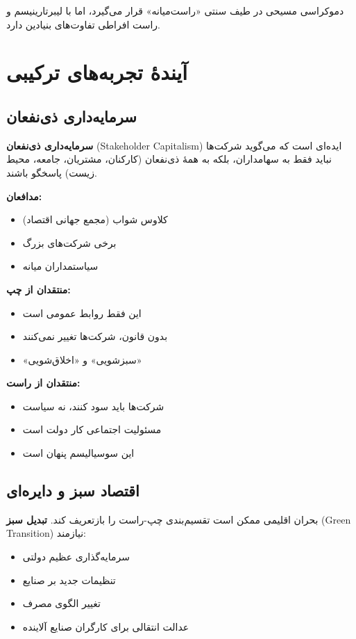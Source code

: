 دموکراسی مسیحی در طیف سنتی «راست‌میانه» قرار می‌گیرد، اما با لیبرتارینیسم و راست افراطی تفاوت‌های بنیادین دارد.


\section{آیندهٔ تجربه‌های ترکیبی}

\subsection{سرمایه‌داری ذی‌نفعان}


\textbf{سرمایه‌داری ذی‌نفعان} (Stakeholder Capitalism) ایده‌ای است که می‌گوید شرکت‌ها نباید فقط به سهامداران، بلکه به همهٔ ذی‌نفعان (کارکنان، مشتریان، جامعه، محیط زیست) پاسخگو باشند.

\textbf{مدافعان:}
\begin{itemize}
    \item کلاوس شواب (مجمع جهانی اقتصاد)
    \item برخی شرکت‌های بزرگ
    \item سیاستمداران میانه
\end{itemize}

\textbf{منتقدان از چپ:}
\begin{itemize}
    \item این فقط روابط عمومی است
    \item بدون قانون، شرکت‌ها تغییر نمی‌کنند
    \item «سبزشویی» و «اخلاق‌شویی»
\end{itemize}

\textbf{منتقدان از راست:}
\begin{itemize}
    \item شرکت‌ها باید سود کنند، نه سیاست
    \item مسئولیت اجتماعی کار دولت است
    \item این سوسیالیسم پنهان است
\end{itemize}


\subsection{اقتصاد سبز و دایره‌ای}


بحران اقلیمی ممکن است تقسیم‌بندی چپ-راست را بازتعریف کند. \textbf{تبدیل سبز} (Green Transition) نیازمند:
\begin{itemize}
    \item سرمایه‌گذاری عظیم دولتی
    \item تنظیمات جدید بر صنایع
    \item تغییر الگوی مصرف
    \item عدالت انتقالی برای کارگران صنایع آلاینده
\end{itemize}

